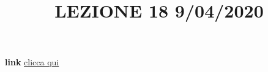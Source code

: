 \title{LEZIONE 18 9/04/2020}\newline
\textbf{link} \href{https://web.microsoftstream.com/video/a6351498-1edd-4ec9-b134-3b5fd7a9a3ee?list=user&userId=faa91214-a6f5-40d7-8875-253fd49b8ce1}{clicca qui}